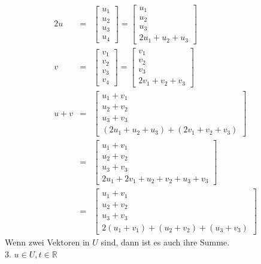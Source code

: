 \documentclass[10pt,a4paper,oneside,ngerman,numbers=noenddot]{scrartcl}
\begin{document}
\begin{alignat*}{2}
u &=& \begin{bmatrix}
u_{1} \\
u_{2} \\
u_{3} \\
u_{4}
\end{bmatrix} = 
\begin{bmatrix}
u_{1} \\
u_{2} \\
u_{3} \\
2u_{1} + u_{2} + u_{3}
\end{bmatrix} \\
v &=& \begin{bmatrix}
v_{1} \\
v_{2} \\
v_{3} \\
v_{4}
\end{bmatrix} =
\begin{bmatrix}
v_{1} \\
v_{2} \\
v_{3} \\
2v_{1} + v_{2} + v_{3}
\end{bmatrix} \\
u + v &=& \begin{bmatrix}
u_{1} + v_{1} \\
u_{2} + v_{2} \\
u_{3} + v_{3} \\
(2u_{1} + u_{2} + u_{3}) + (2v_{1} + v_{2} + v_{3})
\end{bmatrix} \\
&=& \begin{bmatrix}
u_{1} + v_{1} \\
u_{2} + v_{2} \\
u_{3} + v_{3} \\
2u_{1} + 2v_{1} + u_{2} + v_{2} + u_{3} + v_{3}
\end{bmatrix} \\
&=& \begin{bmatrix}
u_{1} + v_{1} \\
u_{2} + v_{2} \\
u_{3} + v_{3} \\
2(u_{1} + v_{1}) + (u_{2} + v_{2}) + (u_{3} + v_{3})
\end{bmatrix}
\end{alignat*}
Wenn zwei Vektoren in $U$ sind, dann ist es auch ihre Summe.\\
3. $u \in U, t \in \mathbb{R}$
\end{document}
